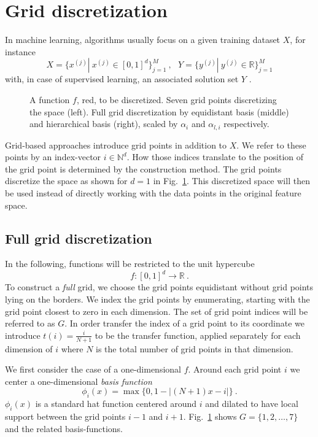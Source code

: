 \section{Grid discretization}\label{sec:grid}

In machine learning, algorithms usually focus on a given training dataset
$X$, for instance
$$ X = \{x^{(j)} | \ x^{(j)} \in [0, 1]^d\}_{j = 1}^M \ , \ \ \
Y = \{y^{(j)} | \ y^{(j)} \in \mathbb{R}\}_{j=1}^M$$
with, in case of supervised learning, an associated solution set $Y$
\cite{artbunshort}.

\par

\begin{figure}[t!]
  \centering
  
  
  
  \caption{A function $f$, red, to be discretized.
    Seven grid points discretizing the space
    (left). Full grid discretization by equidistant basis (middle) and
    hierarchical basis (right), scaled by $\alpha_i$ and $\alpha_{l,i}$
    respectively.\label{fig:fig1}}
\end{figure}

Grid-based approaches introduce grid points in addition to $X$. We refer
to these points by an index-vector $i \in \mathbb{N}^d$. How those indices
translate to the position of the grid point is determined by the construction
method. The grid points discretize the space as shown for $d=1$ in Fig.~\ref{fig:fig1}.
This discretized space
will then be used instead of directly working with the data points in the original
feature space.

\subsection{Full grid discretization}\label{subsec:fullgrid}
In the following, functions
will be restricted to the unit hypercube
 $$ f: [0, 1]^d \rightarrow \mathbb{R} \ .$$
To construct a \emph{full} grid, we choose the grid points equidistant
without grid points lying on the borders. We index the grid points by
enumerating, starting with the grid point closest to zero in each dimension.
The set of grid point indices will be referred to as $G$.
In order transfer the index of a grid point to its coordinate we introduce
$t(i) = \frac{i}{N + 1}$ to be the transfer function, applied separately for
each dimension of $i$
where $N$ is the total number of grid points in that dimension.
\par
We first consider the case of a one-dimensional $f$.
Around each grid point $i$ we center a one-dimensional
\emph{basis function}
$$ \phi_i(x) = \max\{0, 1 - |(N + 1)x - i|\} \ .$$
$\phi_i(x)$ is a standard hat function centered around $i$ and dilated
to have local support between the grid points $i - 1$ and $i + 1$. Fig.~\ref{fig:fig1}
shows $G = \{1,2,\dots,7\}$ and the related basis-functions.

